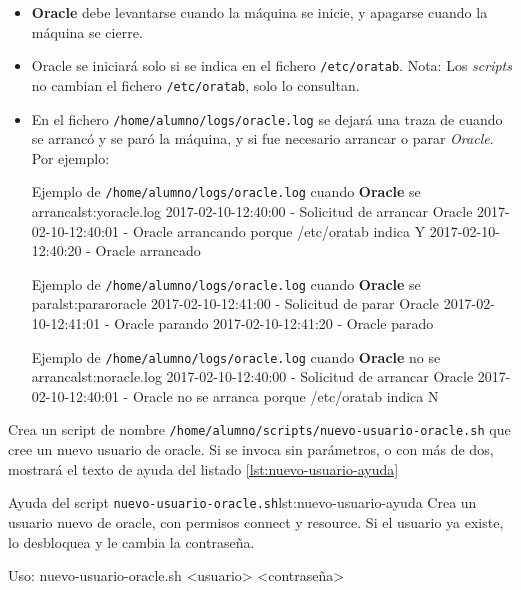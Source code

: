 \begin{homeworkProblem}

  \begin{itemize}
  \item \textbf{Oracle} debe levantarse cuando la máquina se inicie, y apagarse cuando la máquina se cierre.
  \item Oracle se iniciará solo si se indica en el fichero \texttt{/etc/oratab}. {\scriptsize Nota: Los \textit{scripts} no cambian el fichero \texttt{/etc/oratab}, solo lo consultan.}
  
  \item En el fichero \texttt{/home/alumno/logs/oracle.log} se dejará una traza de cuando se arrancó y se paró la máquina, y si fue necesario arrancar o parar \textit{Oracle}. Por ejemplo:
    
    \begin{listadotxt}{Ejemplo de \texttt{/home/alumno/logs/oracle.log} cuando \textbf{Oracle} se arranca}{lst:yoracle.log}
      2017-02-10-12:40:00 - Solicitud de arrancar Oracle
      2017-02-10-12:40:01 - Oracle arrancando porque /etc/oratab indica Y
      2017-02-10-12:40:20 - Oracle arrancado
    \end{listadotxt}

    \begin{listadotxt}{Ejemplo de \texttt{/home/alumno/logs/oracle.log} cuando \textbf{Oracle} se para}{lst:pararoracle}
      2017-02-10-12:41:00 - Solicitud de parar Oracle
      2017-02-10-12:41:01 - Oracle parando
      2017-02-10-12:41:20 - Oracle parado
    \end{listadotxt}

    \begin{listadotxt}{Ejemplo de \texttt{/home/alumno/logs/oracle.log} cuando \textbf{Oracle} no se arranca}{lst:noracle.log}
      2017-02-10-12:40:00 - Solicitud de arrancar Oracle
      2017-02-10-12:40:01 - Oracle no se arranca porque /etc/oratab indica N
    \end{listadotxt}

    
  \end{itemize}
  
\end{homeworkProblem}

\begin{homeworkProblem}
  Crea un script de nombre \texttt{/home/alumno/scripts/nuevo-usuario-oracle.sh} que cree un nuevo usuario de oracle. Si se invoca sin parámetros, o con más de dos, mostrará el texto de ayuda del listado \ref{lst:nuevo-usuario-ayuda}

  \begin{listadotxt}{Ayuda del script \texttt{nuevo-usuario-oracle.sh}}{lst:nuevo-usuario-ayuda}
  Crea un usuario nuevo de oracle, con permisos connect y resource.
  Si el usuario ya existe, lo desbloquea y le cambia la contraseña.
  
  Uso: nuevo-usuario-oracle.sh <usuario> <contraseña>
  \end{listadotxt}
\end{homeworkProblem}


